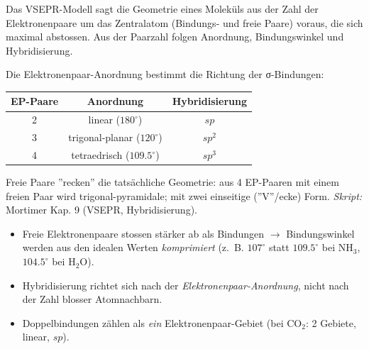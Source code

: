 
Das VSEPR-Modell sagt die Geometrie eines Moleküls aus der Zahl der
Elektronenpaare um das Zentralatom (Bindungs- und freie Paare) voraus, die sich
maximal abstossen. Aus der Paarzahl folgen Anordnung, Bindungswinkel und
Hybridisierung.

\begin{werkzeugkasten}
Die Elektronenpaar-Anordnung bestimmt die Richtung der σ-Bindungen:
\begin{center}
\begin{tabular}{@{}c c c@{}}
  EP-Paare & Anordnung & Hybridisierung \\
  \hline
  2 & linear ($180^\circ$)          & $sp$  \\
  3 & trigonal-planar ($120^\circ$) & $sp^2$ \\
  4 & tetraedrisch ($109.5^\circ$)  & $sp^3$ \\
\end{tabular}
\end{center}
Freie Paare ''recken'' die tatsächliche Geometrie: aus 4 EP-Paaren mit einem
freien Paar wird trigonal-pyramidale; mit zwei einseitige (''V''/ecke) Form.
\textit{Skript:} Mortimer Kap. 9 (VSEPR, Hybridisierung).
\end{werkzeugkasten}

\begin{achtung}
\begin{itemize}
  \item Freie Elektronenpaare stossen stärker ab als Bindungen $\to$
        Bindungswinkel werden aus den idealen Werten \textit{komprimiert}
        (z.\ B. $107^\circ$ statt $109.5^\circ$ bei $\mathrm{NH_3}$, $104.5^\circ$
        bei $\mathrm{H_2O}$).
  \item Hybridisierung richtet sich nach der \textit{Elektronenpaar-Anordnung},
        nicht nach der Zahl blosser Atomnachbarn.
  \item Doppelbindungen zählen als \textit{ein} Elektronenpaar-Gebiet
        (bei $\mathrm{CO_2}$: 2 Gebiete, linear, $sp$).
\end{itemize}
\end{achtung}

